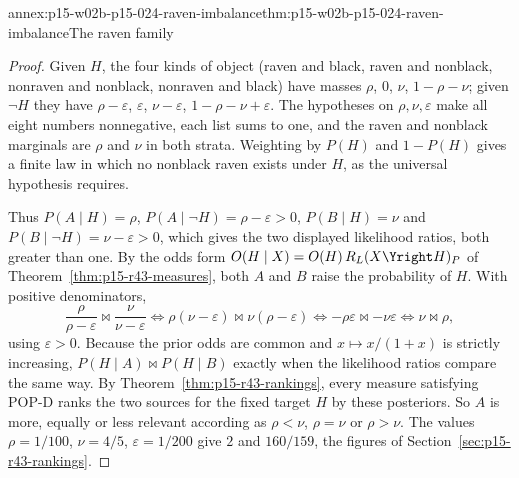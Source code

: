 \begin{annexitem}{annex:p15-w02b-p15-024-raven-imbalance}{thm:p15-w02b-p15-024-raven-imbalance}{The raven family}
\begin{proof}
Given \(H\), the four kinds of object (raven and black, raven and
nonblack, nonraven and nonblack, nonraven and black) have masses
\(\rho\), \(0\), \(\nu\), \(1-\rho-\nu\); given \(\neg H\) they have
\(\rho-\varepsilon\), \(\varepsilon\), \(\nu-\varepsilon\),
\(1-\rho-\nu+\varepsilon\). The hypotheses on \(\rho,\nu,\varepsilon\)
make all eight numbers nonnegative, each list sums to one, and the
raven and nonblack marginals are \(\rho\) and \(\nu\) in both strata.
Weighting by \(P(H)\) and \(1-P(H)\) gives a finite law in which no
nonblack raven exists under \(H\), as the universal hypothesis requires.

Thus \(P(A\mid H)=\rho\), \(P(A\mid\neg H)=\rho-\varepsilon>0\),
\(P(B\mid H)=\nu\) and \(P(B\mid\neg H)=\nu-\varepsilon>0\), which gives
the two displayed likelihood ratios, both greater than one. By the odds
form \(O(H\mid X)=O(H)\,R_L(X\Yright H)_P\) of
Theorem~\ref{thm:p15-r43-measures}, both \(A\) and \(B\) raise the
probability of \(H\). With positive denominators,
\[
 \frac{\rho}{\rho-\varepsilon}\bowtie\frac{\nu}{\nu-\varepsilon}
 \iff \rho(\nu-\varepsilon)\bowtie\nu(\rho-\varepsilon)
 \iff -\rho\varepsilon\bowtie-\nu\varepsilon
 \iff \nu\bowtie\rho ,
\]
using \(\varepsilon>0\). Because the prior odds are common and
\(x\mapsto x/(1+x)\) is strictly increasing, \(P(H\mid A)\bowtie
P(H\mid B)\) exactly when the likelihood ratios compare the same way.
By Theorem~\ref{thm:p15-r43-rankings}, every measure satisfying POP-D
ranks the two sources for the fixed target \(H\) by these posteriors.
So \(A\) is more, equally or less relevant according as \(\rho<\nu\),
\(\rho=\nu\) or \(\rho>\nu\). The values \(\rho=1/100\), \(\nu=4/5\),
\(\varepsilon=1/200\) give \(2\) and \(160/159\), the figures of
Section~\ref{sec:p15-r43-rankings}.
\end{proof}
\end{annexitem}

